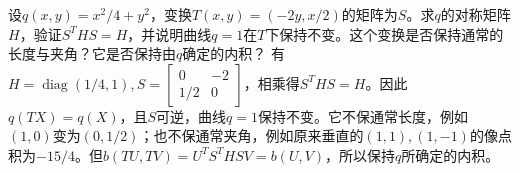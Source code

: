 设\(q(x,y)=x^2/4+y^2\)，变换\(T(x,y)=(-2y,x/2)\)的矩阵为\(S\)。求\(q\)的对称矩阵\(H\)，验证\(S^THS=H\)，并说明曲线\(q=1\)在\(T\)下保持不变。这个变换是否保持通常的长度与夹角？它是否保持由\(q\)确定的内积？
\solutionanswer
有\(H=\operatorname{diag}(1/4,1),S=\begin{bmatrix}0&-2\\1/2&0\end{bmatrix}\)，相乘得\(S^THS=H\)。因此\(q(TX)=q(X)\)，且\(S\)可逆，曲线\(q=1\)保持不变。它不保通常长度，例如\((1,0)\)变为\((0,1/2)\)；也不保通常夹角，例如原来垂直的\((1,1),(1,-1)\)的像点积为\(-15/4\)。但\(b(TU,TV)=U^TS^THSV=b(U,V)\)，所以保持\(q\)所确定的内积。
\par
